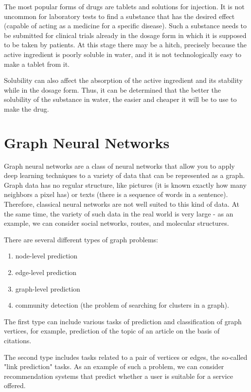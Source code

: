\documentclass[a4paper,14pt]{article}
\begin{document}
The most popular forms of drugs are tablets and solutions for injection. It is not uncommon for laboratory tests to find a substance that has the desired effect (capable of acting as a medicine for a specific disease). Such a substance needs to be submitted for clinical trials already in the dosage form in which it is supposed to be taken by patients. At this stage there may be a hitch, precisely because the active ingredient is poorly soluble in water, and it is not technologically easy to make a tablet from it.

Solubility can also affect the absorption of the active ingredient and its stability while in the dosage form. Thus, it can be determined that the better the solubility of the substance in water, the easier and cheaper it will be to use to make the drug.

\section{Graph Neural Networks}\label{3}

Graph neural networks are a class of neural networks that allow you to apply deep learning techniques to a variety of data that can be represented as a graph. Graph data has no regular structure, like pictures (it is known exactly how many neighbors a pixel has) or texts (there is a sequence of words in a sentence). Therefore, classical neural networks are not well suited to this kind of data. At the same time, the variety of such data in the real world is very large - as an example, we can consider social networks, routes, and molecular structures. 

There are several different types of graph problems:
\begin{enumerate}
  \item node-level prediction
  \item edge-level prediction
  \item graph-level prediction
  \item community detection (the problem of searching for clusters in a graph).
\end{enumerate}

The first type can include various tasks of prediction and classification of graph vertices, for example, prediction of the topic of an article on the basis of citations. 

The second type includes tasks related to a pair of vertices or edges, the so-called "link prediction" tasks. As an example of such a problem, we can consider recommendation systems that predict whether a user is suitable for a service offered. 
\end{document}
